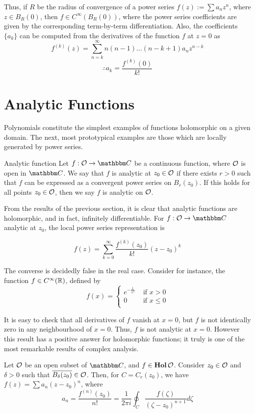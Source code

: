 \documentclass[../ComplexAnalysis_Notes.tex]{subfiles}
\begin{document}
Thus, if $R$ be the radius of convergence of a power series $f(z) := \sum a_n z^n$, where $z \in B_R(0)$, then $f \in C^\infty(B_R(0))$, where the power series coefficients are given by the corresponding term-by-term differentiation. Also, the coefficients $\{a_k\}$ can be computed from the derivatives of the function $f$ at $z=0$ as
\[f^{(k)}(z) = \sum_{n=k}^\infty n(n-1)\dots(n-k+1)a_{n} z^{n-k}\]
\[\therefore  a_k  = \frac{f^{(k)}(0)}{k!}\]

\section{Analytic Functions}

Polynomials constitute the simplest examples of functions holomorphic on a given domain. The next, most prototypical examples are those which are locally generated by power series.

\begin{Def}{Analytic function}{}
Let $f:\mO \to \C$ be a continuous function, where $\mathcal{O}$ is open in $\C$. We say that $f$ is analytic at $z_0 \in \mathcal{O}$ if there exists $r>0$ such that $f$ can be expressed as a convergent power series on $B_r(z_0)$. If this holds for all points $z_0 \in \mathcal{O}$, then we say $f$ is analytic on $\mathcal{O}$.
\end{Def}

From the results of the previous section, it is clear that analytic functions are holomorphic, and in fact, infinitely differentiable. For $f:\mO \to \C$ analytic at $z_0$, the local power series representation is

\[f(z) = \sum_{k=0}^\infty \frac{f^{(k)}(z_0)}{k!}(z - z_0)^k\]

The converse is decidedly false in the real case. Consider for instance, the function $f \in C^\infty(\mathbb{R})$, defined by
\[
f(x) = 
\begin{cases}
e^{-\frac{1}{x^2}} & \text{ if } x>0\\
0 & \text{ if } x \leq 0\\
\end{cases}
\]

It is easy to check that all derivatives of $f$ vanish at $x=0$, but $f$ is not identically zero in any neighbourhood of $x=0$. Thus, $f$ is not analytic at $x=0$. However this result has a positive answer for holomorphic functions; it truly is one of the most remarkable results of complex analysis.

\begin{Thm}{}{}
Let $\mathcal{O}$ be an open subset of $\C$, and $f \in \operatorname{\mathbf{Hol}}{\mathcal{O}}$. Consider $z_0 \in \mathcal{O}$ and $\delta>0$ such that $\overline{B_{\delta}(z_0)} \in \mathcal{O}$. Then, for $C = C_r(z_0)$, we have $f(z) = \sum a_n (z - z_0)^n$, where
\[a_n = \frac{f^{(n)}(z_0)}{n!} = \frac{1}{2\pi i}\oint_{C} \frac{f(\zeta)}{(\zeta - z_0)^{n+1}}d\zeta\]
\end{Thm}
\end{document}
